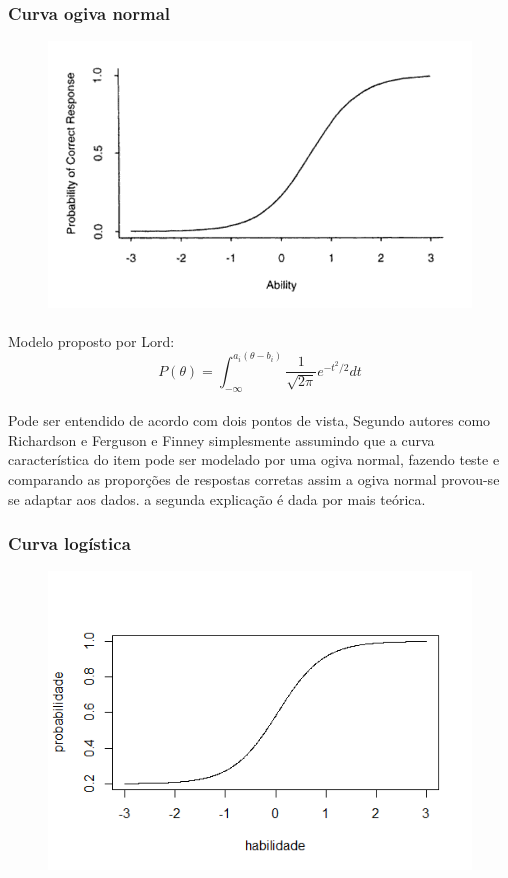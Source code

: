     \subsubsection{Curva ogiva normal}
    \begin{figure}[!h]
    	\centering
    	\includegraphics[width=0.6\linewidth]{img/ogiva}
    	\caption{}
    	\label{fig:ogiva}
    \end{figure}
    \paragraph{}
        Modelo proposto por Lord:
    \begin{equation}
        P(\theta) = \displaystyle\int_{-\infty}^{a_i(\theta - b_i)}\displaystyle\frac{1}{\sqrt{2\pi}}e^{-t^2/2}dt
    \end{equation}
    \paragraph{}
        Pode ser entendido de acordo com dois pontos de vista, Segundo autores como Richardson e Ferguson e Finney  simplesmente assumindo que a curva característica do item pode ser modelado por uma ogiva normal, fazendo teste e comparando as proporções de respostas corretas assim a ogiva normal provou-se se adaptar aos dados. a segunda explicação é dada por \cite{Novick} mais teórica.
        
    \subsubsection{Curva logística}
    \begin{figure}[!h]
    	\centering
    	\includegraphics[width=0.6\linewidth]{img/Rplo}
    	\caption{}
    	\label{fig:rplo}
    \end{figure}
